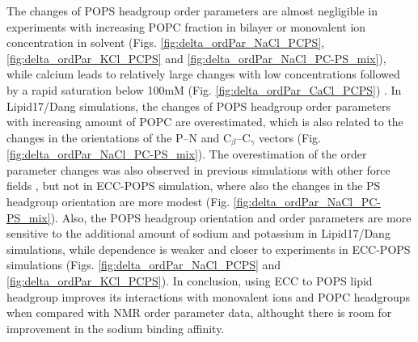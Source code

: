 \documentclass[journal=jpcbfk,manuscript=article]{achemso}
\begin{document}
% 
The changes of POPS headgroup order parameters are almost negligible in experiments with increasing POPC fraction in bilayer
or monovalent ion concentration in solvent
(Figs. \ref{fig:delta_ordPar_NaCl_PCPS}, \ref{fig:delta_ordPar_KCl_PCPS} and \ref{fig:delta_ordPar_NaCl_PC-PS_mix}),
while calcium leads to relatively large changes with low concentrations followed by a rapid saturation below 100mM (Fig. \ref{fig:delta_ordPar_CaCl_PCPS}) \cite{scherer87,roux90}.
In Lipid17/Dang simulations, the changes of POPS headgroup order parameters with increasing amount of POPC
are overestimated, which is also related to the changes in the orientations of the P--N and C$_{\beta}$--C$_{\gamma}$
vectors (Fig. \ref{fig:delta_ordPar_NaCl_PC-PS_mix}). The overestimation of the order parameter changes
was also observed in previous simulations with other force fields \cite{nmrlipids_proj4}, but not in
ECC-POPS simulation, where also the changes in the PS headgroup orientation are more modest (Fig. \ref{fig:delta_ordPar_NaCl_PC-PS_mix}).
Also, the POPS headgroup orientation and order parameters are more sensitive to the additional amount
of sodium and potassium in Lipid17/Dang simulations, while dependence is weaker and closer to experiments
in ECC-POPS simulations (Figs. \ref{fig:delta_ordPar_NaCl_PCPS} and \ref{fig:delta_ordPar_KCl_PCPS}).
In conclusion, using ECC to POPS lipid headgroup improves its
interactions with monovalent ions and POPC headgroups when compared with NMR order parameter data,
althought there is room for improvement in the sodium binding affinity.
\end{document}
